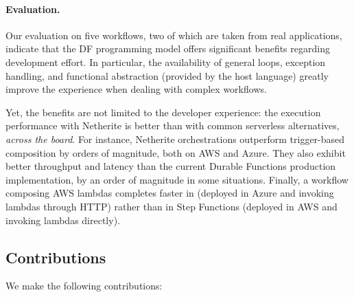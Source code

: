 \paragraph{Evaluation.} 

Our evaluation on five workflows, two of which are taken from real applications, indicate that the DF programming model offers significant benefits regarding development effort. 
In particular, the availability of general loops, exception handling, and functional abstraction (provided by the host language) greatly improve the experience when dealing with complex workflows. 

Yet, the benefits are not limited to the developer experience: the execution performance with Netherite is better than with common serverless alternatives, \emph{across the board}. For instance, Netherite orchestrations outperform  trigger-based composition by orders of magnitude, both on AWS and Azure. They also exhibit better throughput and latency than the current Durable Functions production implementation, by an order of magnitude in some situations. Finally, a workflow composing AWS lambdas completes faster in \sys (deployed in Azure and invoking lambdas through HTTP) rather than in Step Functions (deployed in AWS and invoking lambdas directly). 

\subsection{Contributions}
 
We make the following contributions:

